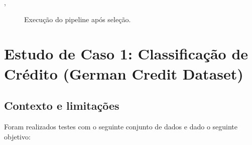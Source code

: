 \documentclass[portugues]{ic-tese}
\begin{document}
,
\begin{figure}[H]
    \centering
    \caption{Execução do pipeline após seleção.}
    \label{fig:pipelineAutonomoResultado}
\end{figure}

\chapter{Estudo de Caso 1: Classificação de Crédito (German Credit Dataset)}

\section{Contexto e limitações}

Foram realizados testes com o seguinte conjunto de dados e dado o seguinte objetivo:
\end{document}
